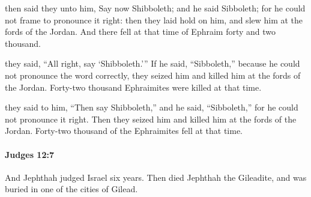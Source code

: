 			\begin{versebox}
					\item[BHS] 
					\item[ASV] then said they unto him, Say now Shibboleth; and he said Sibboleth; for he could not frame to pronounce it right: then they laid hold on him, and slew him at the fords of the Jordan. And there fell at that time of Ephraim forty and two thousand.
					\item[NIV] they said, “All right, say ‘Shibboleth.’” If he said, “Sibboleth,” because he could not pronounce the word correctly, they seized him and killed him at the fords of the Jordan. Forty-two thousand Ephraimites were killed at that time.
					\item[NRSV] they said to him, “Then say Shibboleth,” and he said, “Sibboleth,” for he could not pronounce it right. Then they seized him and killed him at the fords of the Jordan. Forty-two thousand of the Ephraimites fell at that time.
			\end{versebox}

		\paragraph{Judges 12:7} %
			\label{JUDGES-12-7}

			And Jephthah judged Israel six years. Then died Jephthah the Gileadite, and was buried in one of the cities of Gilead.

